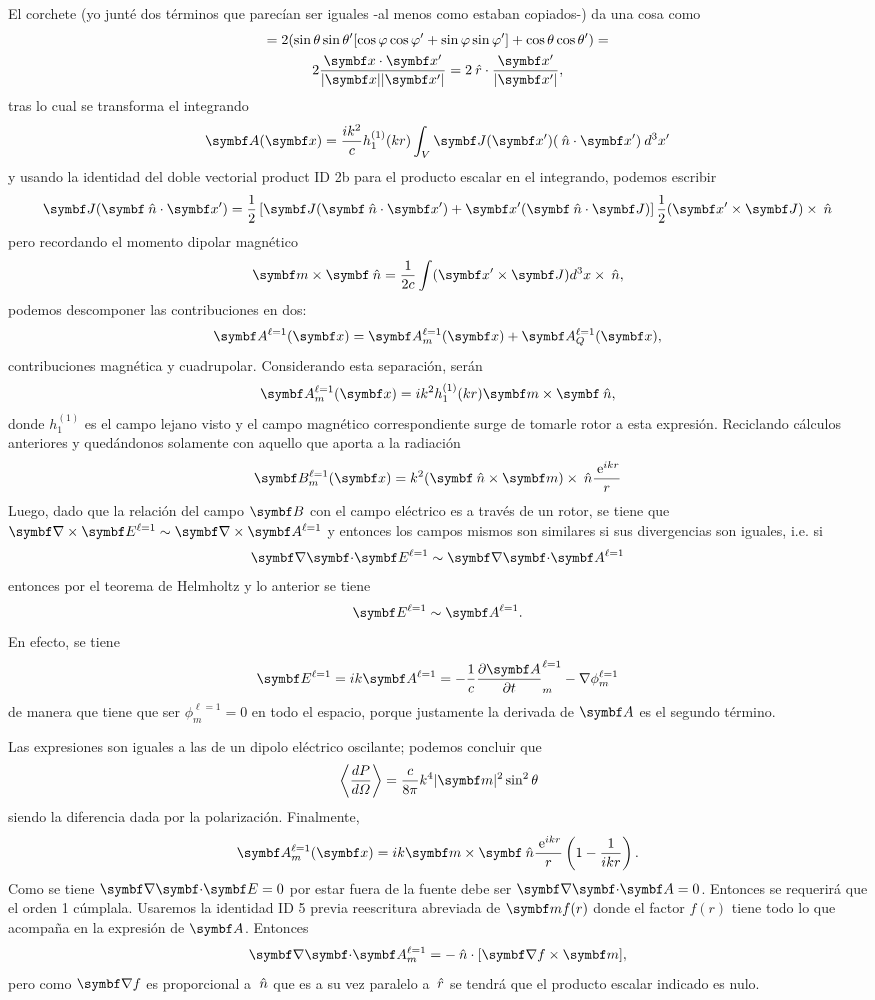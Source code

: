 \documentclass[10pt,oneside]{CBFT_book}
\begin{document}

El corchete (yo junté dos términos que parecían ser iguales -al menos como estaban copiados-) da una cosa
como
\begin{multline*}
	[..] = 2 (\sin\theta\sin\theta'[\cos\vp\cos\vp' + \sin\vp\sin\vp'] + \cos\theta\cos\theta') = \\
	2 \frac{\pe{x}{x'}}{|\vbx||\vbx'|} = 2 \rver\cdot\frac{\vbx'}{|\vbx'|}, 
\end{multline*}
tras lo cual se transforma el integrando
\[
	\vb{A}(\vbx) = \frac{ i k^2 }{ c } h^{(1)}_1(kr) \int_V \vb{J}(\vbx') ( \nver \cdot \vbx' ) \: d^3x'
\]
y usando la identidad del doble vectorial product ID 2b para el producto escalar en el integrando,
podemos escribir
\[
	\vb{J}(\pe{\nver}{x'}) = \frac{1}{2}
	\left[ \vb{J} (\pe{\nver}{x'}) + \vbx' (\pe{\nver}{J}) \right]
	\frac{1}{2}( \pv{x'}{J} ) \times \nver
\]
pero recordando el momento dipolar magnético
\[
	\pv{m}{\nver} = \frac{1}{2c} \int (\pv{x'}{J}) d^3x \times \nver,
\]
podemos descomponer las contribuciones en dos:
\[
	\vb{A}^{\ell=1}(\vbx) = \vb{A}^{\ell=1}_m(\vbx) + \vb{A}^{\ell=1}_Q(\vbx),
\]
contribuciones magnética y cuadrupolar.
Considerando esta separación, serán
\[
	\vb{A}^{\ell=1}_m(\vbx) = i k^2 h_1^{(1)}(kr) \pv{m}{\nver}, 
\]
donde $h_1^{(1)}$ es el campo lejano visto y el campo magnético correspondiente surge de tomarle
rotor a esta expresión.
Reciclando cálculos anteriores y quedándonos solamente con aquello que aporta a la radiación
\[
	\vb{B}^{\ell=1}_m(\vbx) = k^2 (\pv{\nver}{m}) \times \nver \frac{\euler^{ikr}}{r}
\]
Luego, dado que la relación del campo $\vb B$ con el campo eléctrico es a través de un rotor,
se tiene que $ \rotorm{E}^{\ell=1} \sim \rotorm{A}^{\ell=1} $ y entonces los campos mismos
son similares si sus divergencias son iguales, i.e. si
\[
	\divem{E}^{\ell=1} \sim \divem{A}^{\ell=1}
\]
entonces por el teorema de Helmholtz y lo anterior se tiene
\[
	\vb{E}^{\ell=1} \sim \vb{A}^{\ell=1}.
\]
En efecto, se tiene
\[
	\vb{E}^{\ell=1} = i k \vb{A}^{\ell=1} = 
	- \frac{1}{c}\dpar{\vb A}{t}_m^{\ell=1} - \nabla\phi_m^{\ell=1} 
\]
de manera que tiene que ser $\phi_m^{\ell=1} = 0$ en todo el espacio, porque justamente
la derivada de $\vb A$ es el segundo término.

Las expresiones son iguales a las de un dipolo eléctrico oscilante; podemos concluir que
\[
	\vm{\dtot{P}{\Omega}} = \frac{c}{8\pi} k^4 |\vb m|^2 \sin^2\theta
\]
siendo la diferencia dada por la polarización.
Finalmente,
\[
	\vb{A}^{\ell=1}_m(\vbx) = i k \pv{m}{\nver}\frac{\euler^{ikr}}{r} 
	\left( 1 - \frac{1}{ikr} \right). 
\]
Como se tiene $\divem{E}=0$ por estar fuera de la fuente debe ser $\divem{A}=0$.
Entonces se requerirá que el orden 1 cúmplala.
Usaremos la identidad ID 5 previa reescritura abreviada de $\vb m f(r)$ donde el factor
$f(r)$ tiene todo lo que acompaña en la expresión de $\vb A$. Entonces
\[
	\divem{A}^{\ell=1}_m = - \nver \cdot [ \Nabla f \times \vb m],
\]
pero como $\Nabla f$ es proporcional a $\:\hat{n}$ que es a su vez paralelo a $\:\hat{r}$ se
tendrá que el producto escalar indicado es nulo.
\end{document}
